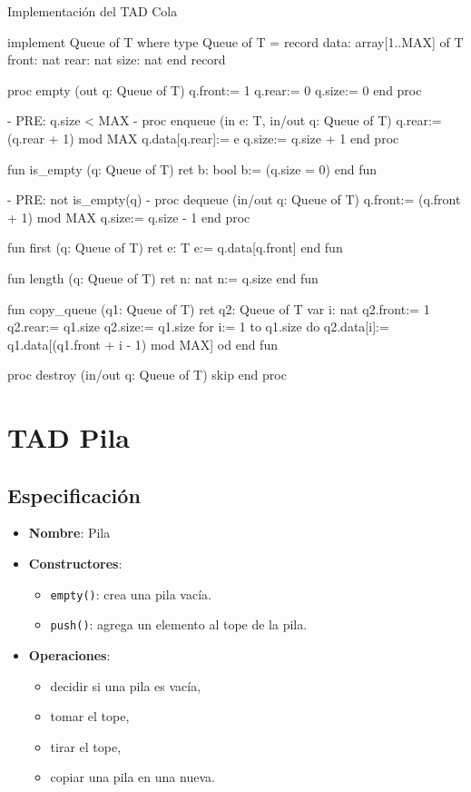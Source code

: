 \begin{codebox}{Implementación del TAD Cola}
\begin{pascallike}
implement Queue of T where
type Queue of T = record
    data: array[1..MAX] of T
    front: nat
    rear: nat
    size: nat
end record

proc empty (out q: Queue of T)
    q.front:= 1
    q.rear:= 0
    q.size:= 0
end proc

{- PRE: q.size < MAX -}
proc enqueue (in e: T, in/out q: Queue of T)
    q.rear:= (q.rear + 1) mod MAX
    q.data[q.rear]:= e
    q.size:= q.size + 1
end proc

fun is_empty (q: Queue of T) ret b: bool
    b:= (q.size = 0)
end fun

{- PRE: not is_empty(q) -}
proc dequeue (in/out q: Queue of T)
    q.front:= (q.front + 1) mod MAX
    q.size:= q.size - 1
end proc

fun first (q: Queue of T) ret e: T
    e:= q.data[q.front]
end fun

fun length (q: Queue of T) ret n: nat
    n:= q.size
end fun

fun copy_queue (q1: Queue of T) ret q2: Queue of T
    var i: nat
    q2.front:= 1
    q2.rear:= q1.size
    q2.size:= q1.size
    for i:= 1 to q1.size do
        q2.data[i]:= q1.data[(q1.front + i - 1) mod MAX]
    od
end fun

proc destroy (in/out q: Queue of T)
    skip
end proc
\end{pascallike}
\end{codebox}

\section{TAD Pila}

\subsection{Especificación}
\begin{itemize}
    \item \textbf{Nombre}: Pila
    \item \textbf{Constructores}:
    \begin{itemize}
        \item \texttt{empty()}: crea una pila vacía.
        \item \texttt{push()}: agrega un elemento al tope de la pila.
    \end{itemize}
    \item \textbf{Operaciones}:
    \begin{itemize}
        \item decidir si una pila es vacía,
        \item tomar el tope,
        \item tirar el tope,
        \item copiar una pila en una nueva.
    \end{itemize}
\end{itemize}

